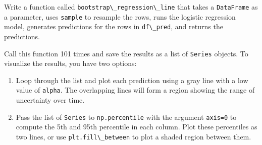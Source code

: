 Write a function called
\passthrough{\lstinline!bootstrap\_regression\_line!} that takes a
\passthrough{\lstinline!DataFrame!} as a parameter, uses
\passthrough{\lstinline!sample!} to resample the rows, runs the logistic
regression model, generates predictions for the rows in
\passthrough{\lstinline!df\_pred!}, and returns the predictions.

\pagebreak

Call this function 101 times and save the results as a list of
\passthrough{\lstinline!Series!} objects. To visualize the results, you
have two options:

\begin{enumerate}
\def\labelenumi{\arabic{enumi}.}
\item
  Loop through the list and plot each prediction using a gray line with
  a low value of \passthrough{\lstinline!alpha!}. The overlapping lines
  will form a region showing the range of uncertainty over time.
\item
  Pass the list of \passthrough{\lstinline!Series!} to
  \passthrough{\lstinline!np.percentile!} with the argument
  \passthrough{\lstinline!axis=0!} to compute the 5th and 95th
  percentile in each column. Plot these percentiles as two lines, or use
  \passthrough{\lstinline!plt.fill\_between!} to plot a shaded region
  between them.
\end{enumerate}
